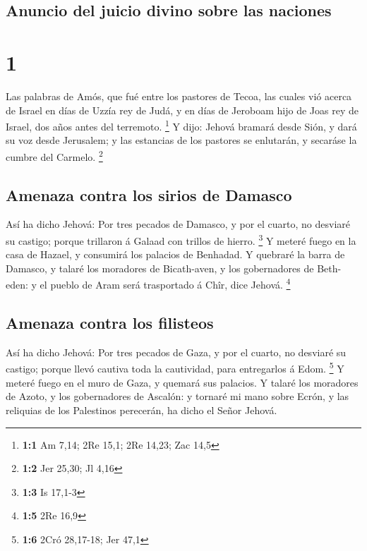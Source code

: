 \hypertarget{anuncio-del-juicio-divino-sobre-las-naciones}{%
\subsection{Anuncio del juicio divino sobre las
naciones}\label{anuncio-del-juicio-divino-sobre-las-naciones}}

\hypertarget{section}{%
\section{1}\label{section}}

 Las palabras de Amós, que fué entre los pastores de
Tecoa, las cuales vió acerca de Israel en días de Uzzía rey de Judá, y
en días de Jeroboam hijo de Joas rey de Israel, dos años antes del
terremoto. \footnote{\textbf{1:1} Am 7,14; 2Re 15,1; 2Re 14,23; Zac 14,5}
 Y dijo: Jehová bramará desde Sión, y dará su voz desde
Jerusalem; y las estancias de los pastores se enlutarán, y secaráse la
cumbre del Carmelo. \footnote{\textbf{1:2} Jer 25,30; Jl 4,16}

\hypertarget{amenaza-contra-los-sirios-de-damasco}{%
\subsection{Amenaza contra los sirios de
Damasco}\label{amenaza-contra-los-sirios-de-damasco}}

 Así ha dicho Jehová: Por tres pecados de Damasco, y por
el cuarto, no desviaré su castigo; porque trillaron á Galaad con trillos
de hierro. \footnote{\textbf{1:3} Is 17,1-3}  Y meteré
fuego en la casa de Hazael, y consumirá los palacios de Benhadad.
 Y quebraré la barra de Damasco, y talaré los moradores de
Bicath-aven, y los gobernadores de Beth-eden: y el pueblo de Aram será
trasportado á Chîr, dice Jehová. \footnote{\textbf{1:5} 2Re 16,9}

\hypertarget{amenaza-contra-los-filisteos}{%
\subsection{Amenaza contra los
filisteos}\label{amenaza-contra-los-filisteos}}

 Así ha dicho Jehová: Por tres pecados de Gaza, y por el
cuarto, no desviaré su castigo; porque llevó cautiva toda la cautividad,
para entregarlos á Edom. \footnote{\textbf{1:6} 2Cró 28,17-18; Jer 47,1}
 Y meteré fuego en el muro de Gaza, y quemará sus
palacios.  Y talaré los moradores de Azoto, y los
gobernadores de Ascalón: y tornaré mi mano sobre Ecrón, y las reliquias
de los Palestinos perecerán, ha dicho el Señor Jehová.


